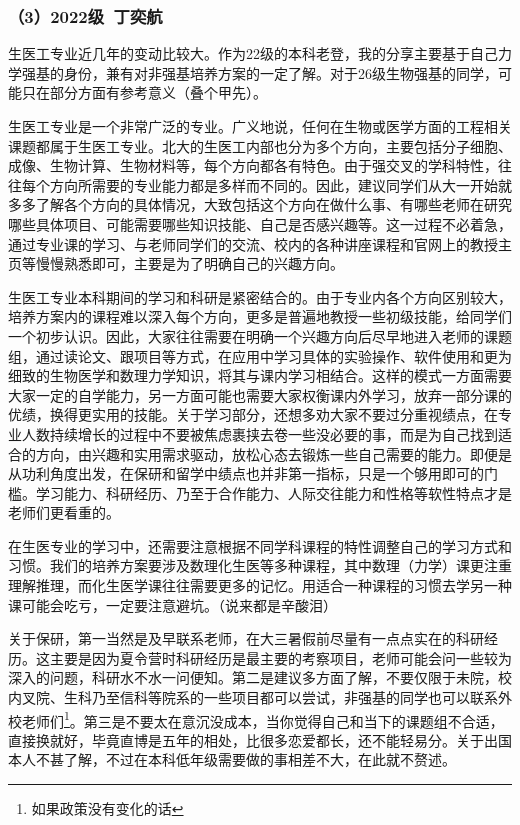 \documentclass[11pt,oneside]{book}
\begin{document}
\subsubsection{（3）2022级\ 丁奕航}

生医工专业近几年的变动比较大。作为22级的本科老登，我的分享主要基于自己力学强基的身份，兼有对非强基培养方案的一定了解。对于26级生物强基的同学，可能只在部分方面有参考意义（叠个甲先）。

\vspace{10pt}

生医工专业是一个非常广泛的专业。广义地说，任何在生物或医学方面的工程相关课题都属于生医工专业。北大的生医工内部也分为多个方向，主要包括分子细胞、成像、生物计算、生物材料等，每个方向都各有特色。由于强交叉的学科特性，往往每个方向所需要的专业能力都是多样而不同的。因此，建议同学们从大一开始就多多了解各个方向的具体情况，大致包括这个方向在做什么事、有哪些老师在研究哪些具体项目、可能需要哪些知识技能、自己是否感兴趣等。这一过程不必着急，通过专业课的学习、与老师同学们的交流、校内的各种讲座课程和官网上的教授主页等慢慢熟悉即可，主要是为了明确自己的兴趣方向。

\vspace{10pt}

生医工专业本科期间的学习和科研是紧密结合的。由于专业内各个方向区别较大，培养方案内的课程难以深入每个方向，更多是普遍地教授一些初级技能，给同学们一个初步认识。因此，大家往往需要在明确一个兴趣方向后尽早地进入老师的课题组，通过读论文、跟项目等方式，在应用中学习具体的实验操作、软件使用和更为细致的生物医学和数理力学知识，将其与课内学习相结合。这样的模式一方面需要大家一定的自学能力，另一方面可能也需要大家权衡课内外学习，放弃一部分课的优绩，换得更实用的技能。关于学习部分，还想多劝大家不要过分重视绩点，在专业人数持续增长的过程中不要被焦虑裹挟去卷一些没必要的事，而是为自己找到适合的方向，由兴趣和实用需求驱动，放松心态去锻炼一些自己需要的能力。即便是从功利角度出发，在保研和留学中绩点也并非第一指标，只是一个够用即可的门槛。学习能力、科研经历、乃至于合作能力、人际交往能力和性格等软性特点才是老师们更看重的。

\vspace{10pt}

在生医专业的学习中，还需要注意根据不同学科课程的特性调整自己的学习方式和习惯。我们的培养方案要涉及数理化生医等多种课程，其中数理（力学）课更注重理解推理，而化生医学课往往需要更多的记忆。用适合一种课程的习惯去学另一种课可能会吃亏，一定要注意避坑。（说来都是辛酸泪）

\vspace{10pt}

关于保研，第一当然是及早联系老师，在大三暑假前尽量有一点点实在的科研经历。这主要是因为夏令营时科研经历是最主要的考察项目，老师可能会问一些较为深入的问题，科研水不水一问便知。第二是建议多方面了解，不要仅限于未院，校内叉院、生科乃至信科等院系的一些项目都可以尝试，非强基的同学也可以联系外校老师们\footnote{如果政策没有变化的话}。第三是不要太在意沉没成本，当你觉得自己和当下的课题组不合适，直接换就好，毕竟直博是五年的相处，比很多恋爱都长，还不能轻易分。关于出国本人不甚了解，不过在本科低年级需要做的事相差不大，在此就不赘述。
\end{document}
